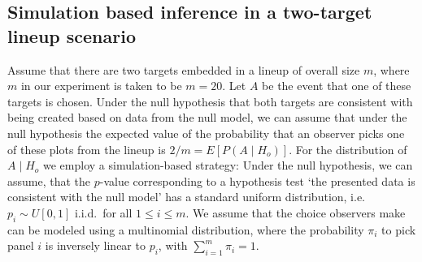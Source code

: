 \documentclass[12pt]{article}\usepackage[]{graphicx}\usepackage[]{color}
\begin{document}
\begin{appendix}

\section{Simulation based inference in a two-target lineup scenario}\label{sec:simulation}

Assume that there are two targets embedded in a lineup of overall size $m$, where $m$ in our experiment is taken to be $m=20$. Let $A$ be the event that one of these targets is chosen.
Under the null hypothesis that both targets are consistent with being created based on data from the null model, we can assume that under the null hypothesis the expected value of the probability that an observer picks one of these plots from the lineup is $2/m = E[ P(A \mid H_o) ]$.
For the distribution of $A \mid H_o$ we employ a simulation-based strategy:
Under the null hypothesis, we can assume, that the $p$-value corresponding to a hypothesis test `the presented data is consistent with the null model' has a standard uniform distribution, i.e. $p_i \sim U[0,1]$ i.i.d.~for all $1 \le i \le m$. We assume that the choice observers make can be modeled using a multinomial distribution, where the probability $\pi_i$ to pick panel $i$ is inversely linear to $p_i$, with $\sum_{i=1}^m \pi_i = 1$.
 

\end{appendix}
\end{document}
